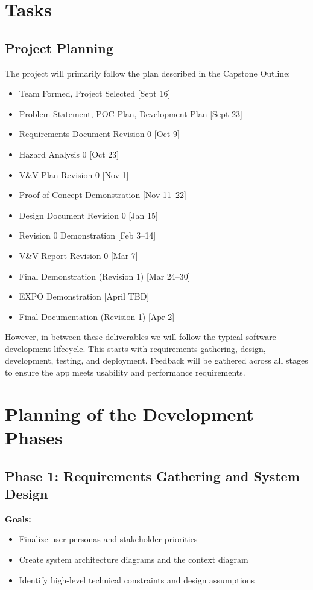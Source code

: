 \documentclass[12pt]{article}
\begin{document}
\section{Tasks}

\subsection{Project Planning}

The project will primarily follow the plan described in the Capstone Outline:

\begin{itemize}
    \item Team Formed, Project Selected [Sept 16]
    \item Problem Statement, POC Plan, Development Plan [Sept 23]
    \item Requirements Document Revision 0 [Oct 9]
    \item Hazard Analysis 0 [Oct 23]
    \item V\&V Plan Revision 0 [Nov 1]
    \item Proof of Concept Demonstration [Nov 11--22]
    \item Design Document Revision 0 [Jan 15]
    \item Revision 0 Demonstration [Feb 3--14]
    \item V\&V Report Revision 0 [Mar 7]
    \item Final Demonstration (Revision 1) [Mar 24--30]
    \item EXPO Demonstration [April TBD]
    \item Final Documentation (Revision 1) [Apr 2]
\end{itemize}

However, in between these deliverables we will follow the typical software development lifecycle. This starts with requirements gathering, design, development, testing, and deployment. Feedback will be gathered across all stages to ensure the app meets usability and performance requirements.

\section{Planning of the Development Phases}

\subsection*{Phase 1: Requirements Gathering and System Design}
\textbf{Goals:}
\begin{itemize}
  \item Finalize user personas and stakeholder priorities
  \item Create system architecture diagrams and the context diagram
  \item Identify high-level technical constraints and design assumptions
\end{itemize}
\end{document}

